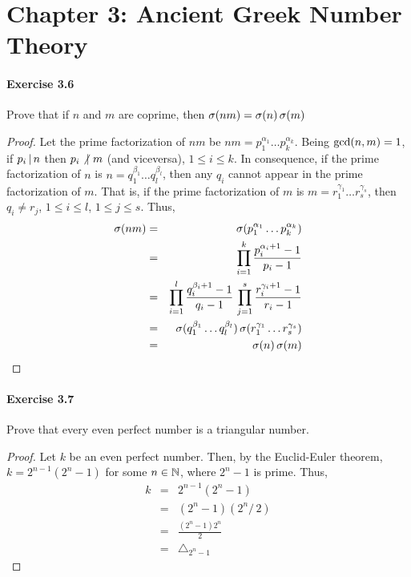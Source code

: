 \section*{Chapter 3: Ancient Greek Number Theory}

\paragraph{Exercise 3.6}
Prove that if $n$ and $m$ are coprime, then $\sigma(nm) = 
\sigma(n) \, \sigma(m)$

\begin{proof}
Let the prime factorization of $nm$ be 
$nm = p_1^{\alpha_1} \dots p_k^{\alpha_k}$.
Being $\textrm{gcd}(n, m) = 1$, if $p_i \, | \, n$ then $p_i \not| \,\, m$
(and viceversa), $1 \leq i \leq k$. In consequence, if the prime factorization
of $n$ is $n = q_1^{\beta_1} \dots q_l^{\beta_l}$, then any $q_i$ cannot appear
in the prime factorization of $m$. That is, if the prime
factorization of $m$ is $m = r_1^{\gamma_1} \dots r_s^{\gamma_s}$, 
then $q_i \neq r_j$, $1 \leq i \leq l$, $1 \leq j \leq s$. Thus,
\begin{eqnarray*}
\sigma(nm) &=& \sigma(p_1^{\alpha_1} \dots p_k^{\alpha_k}) \\
            &=& \prod_{i = 1}^{k}{\frac{p_i^{\alpha_i + 1} - 1}{p_i - 1}} \\
            &=& \prod_{i = 1}^{l}{\frac{q_i^{\beta_i + 1} - 1}{q_i - 1}} \,
                \prod_{j = 1}^{s}{\frac{r_i^{\gamma_i + 1} - 1}{r_i - 1}} \\
            &=& \sigma(q_1^{\beta_1} \dots q_l^{\beta_l}) \,
                \sigma(r_1^{\gamma_1} \dots r_s^{\gamma_s}) \\
            &=& \sigma(n) \, \sigma(m)
\end{eqnarray*}
\end{proof}

\paragraph{Exercise 3.7}
Prove that every even perfect number is a triangular number.

\begin{proof}
Let $k$ be an even perfect number. Then, by the Euclid-Euler theorem,
$k = 2^{n-1} (2^n - 1)$ for some $n \in \mathbb{N}$, where $2^n - 1$ is prime.
Thus,
\begin{eqnarray*}
k &=& 2^{n-1} (2^n - 1)\\
  &=& (2^n - 1) (2^n / \, 2) \\
  &=& \frac{(2^n - 1) 2^n}{2} \\
  &=& \triangle_{2^n - 1}
\end{eqnarray*}

\end{proof}


